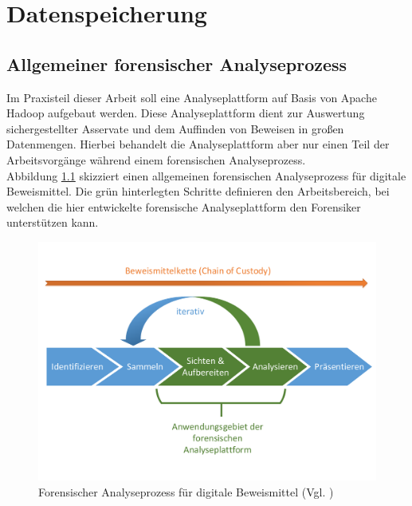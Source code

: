 \chapter{Datenspeicherung}
\label{ch:data_persistence}

\section{Allgemeiner forensischer Analyseprozess}
\label{sec:common_analysis_process}
Im Praxisteil dieser Arbeit soll eine Analyseplattform auf Basis von Apache Hadoop aufgebaut werden. Diese Analyseplattform dient zur Auswertung sichergestellter Asservate und dem Auffinden von Beweisen in großen Datenmengen. Hierbei behandelt die Analyseplattform aber nur einen Teil der Arbeitsvorgänge während einem forensischen Analyseprozess.\\

\noindent
Abbildung \ref{fig:digital_forensics_process} skizziert einen allgemeinen forensischen Analyseprozess für digitale Beweismittel.\cite[S.16]{digital_forensics} Die grün hinterlegten Schritte definieren den Arbeitsbereich, bei welchen die hier entwickelte forensische Analyseplattform den Forensiker unterstützen kann.\\ 
\begin{figure}[ht]
  \centering
  \includegraphics[width=\textwidth]{./resource/digital_forensics_process.pdf}
  \caption{Forensischer Analyseprozess für digitale Beweismittel (Vgl. \cite[S.16]{digital_forensics})}
  \label{fig:digital_forensics_process}
\end{figure}


